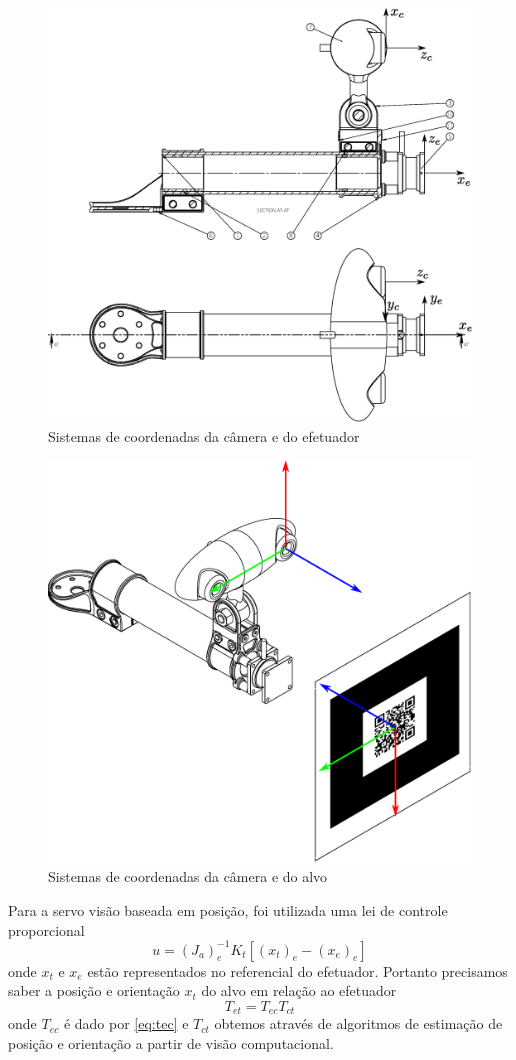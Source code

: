 \begin{figure}[!h]
  \centering
  \includegraphics[width=0.8\linewidth]{./img/effector2}
  \caption{Sistemas de coordenadas da câmera e do efetuador}
  \label{fig:camera_ref}
\end{figure}

\begin{figure}[!h]
  \centering
  \includegraphics[width=0.8\linewidth]{./img/camera_target}
  \caption{Sistemas de coordenadas da câmera e do alvo}
  \label{fig:camera_target}
\end{figure}


Para a servo visão baseada em posição, foi utilizada uma lei de controle proporcional
\begin{equation} \label{eq:lei_posicao}
{u} = ({J}_{a})_e^{-1} {K}_t [({x}_t)_e - ({x_e})_e]
\end{equation}
onde ${x}_t$ e ${x_e}$ estão representados no referencial do efetuador. Portanto precisamos saber a posição e orientação ${x}_t$ do alvo em relação ao efetuador
\begin{equation}
{T}_{et} = {T}_{ec} {T}_{ct}
\end{equation}
onde ${T}_{ec}$ é dado por \eqref{eq:tec} e ${T}_{ct}$ obtemos através de algoritmos de estimação de posição e orientação a partir de visão computacional. 

